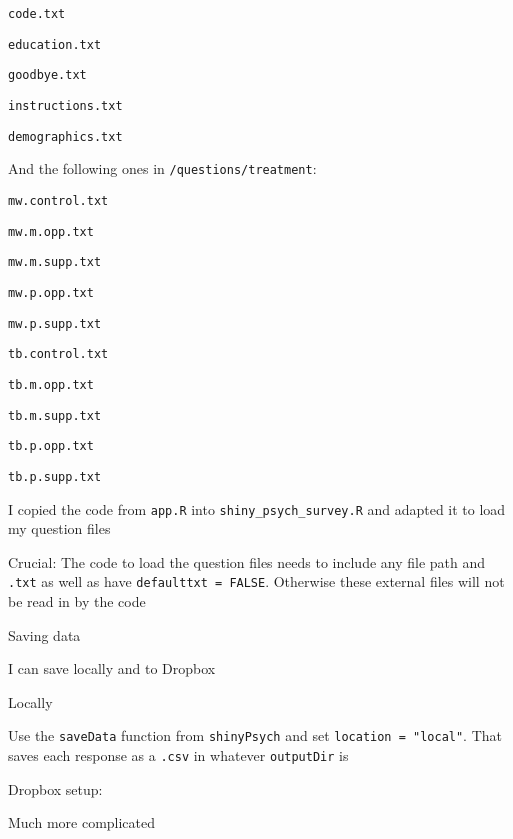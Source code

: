 \begin{coi}
\begin{coi}
					\begin{coi}
						\item {\tt code.txt}
						\item {\tt education.txt}
						\item {\tt goodbye.txt}
						\item {\tt instructions.txt}
						\item {\tt demographics.txt}
					\end{coi}
					And the following ones in {\tt /questions/treatment}:
					\begin{coi}
						\item {\tt mw.control.txt}
						\item {\tt mw.m.opp.txt}
						\item {\tt mw.m.supp.txt}
						\item {\tt mw.p.opp.txt}
						\item {\tt mw.p.supp.txt}
						\item {\tt tb.control.txt}
						\item {\tt tb.m.opp.txt}
						\item {\tt tb.m.supp.txt}
						\item {\tt tb.p.opp.txt}
						\item {\tt tb.p.supp.txt}			
					\end{coi}
				\item I copied the code from {\tt app.R} into {\tt shiny\_psych\_survey.R} and adapted it to load my question files
				\item Crucial: The code to load the question files needs to include any file path and {\tt .txt} as well as have {\tt defaulttxt = FALSE}. Otherwise these external files will not be read in by the code
			\end{coi}
		\item Saving data 
			\begin{coi}
				\item I can save locally and to Dropbox
				\item Locally
					\begin{coi}
						\item Use the {\tt saveData} function from {\tt shinyPsych} and set {\tt location = "local"}. That saves each response as a {\tt .csv} in whatever {\tt outputDir} is
					\end{coi}
				\item Dropbox setup:
					\begin{coi}
						\item Much more complicated

\end{coi}
\end{coi}
\end{coi}
